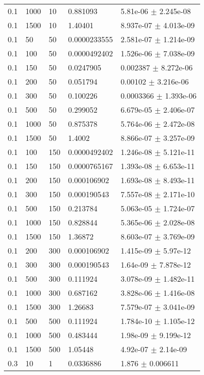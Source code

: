\begin{longtable}{lllll}
 0.1 &  1000 &    10 & 0.881093 & 5.81e-06 $\pm$ 2.245e-08 \\
 0.1 &  1500 &    10 &  1.40401 & 8.937e-07 $\pm$ 4.013e-09 \\
 0.1 &    50 &    50 & 0.0000233555 & 2.581e-07 $\pm$ 1.214e-09 \\
 0.1 &   100 &    50 & 0.0000492402 & 1.526e-06 $\pm$ 7.038e-09 \\
 0.1 &   150 &    50 & 0.0247905 & 0.002387 $\pm$ 8.272e-06 \\
 0.1 &   200 &    50 & 0.051794 &  0.00102 $\pm$ 3.216e-06 \\
 0.1 &   300 &    50 & 0.100226 & 0.0003366 $\pm$ 1.393e-06 \\
 0.1 &   500 &    50 & 0.299052 & 6.679e-05 $\pm$ 2.406e-07 \\
 0.1 &  1000 &    50 & 0.875378 & 5.764e-06 $\pm$ 2.472e-08 \\
 0.1 &  1500 &    50 &   1.4002 & 8.866e-07 $\pm$ 3.257e-09 \\
 0.1 &   100 &   150 & 0.0000492402 & 1.246e-08 $\pm$ 5.121e-11 \\
 0.1 &   150 &   150 & 0.0000765167 & 1.393e-08 $\pm$ 6.653e-11 \\
 0.1 &   200 &   150 & 0.000106902 & 1.693e-08 $\pm$ 8.493e-11 \\
 0.1 &   300 &   150 & 0.000190543 & 7.557e-08 $\pm$ 2.171e-10 \\
 0.1 &   500 &   150 & 0.213784 & 5.063e-05 $\pm$ 1.724e-07 \\
 0.1 &  1000 &   150 & 0.828844 & 5.365e-06 $\pm$ 2.028e-08 \\
 0.1 &  1500 &   150 &  1.36872 & 8.603e-07 $\pm$ 3.769e-09 \\
 0.1 &   200 &   300 & 0.000106902 & 1.415e-09 $\pm$ 5.97e-12 \\
 0.1 &   300 &   300 & 0.000190543 & 1.64e-09 $\pm$ 7.878e-12 \\
 0.1 &   500 &   300 & 0.111924 & 3.078e-09 $\pm$ 1.482e-11 \\
 0.1 &  1000 &   300 & 0.687162 & 3.828e-06 $\pm$ 1.416e-08 \\
 0.1 &  1500 &   300 &  1.26683 & 7.579e-07 $\pm$ 3.041e-09 \\
 0.1 &   500 &   500 & 0.111924 & 1.784e-10 $\pm$ 1.105e-12 \\
 0.1 &  1000 &   500 & 0.483444 & 1.98e-09 $\pm$ 9.199e-12 \\
 0.1 &  1500 &   500 &  1.05448 & 4.92e-07 $\pm$ 2.14e-09 \\
 0.3 &    10 &     1 & 0.0336886 &    1.876 $\pm$ 0.006611 \\

\end{longtable}
